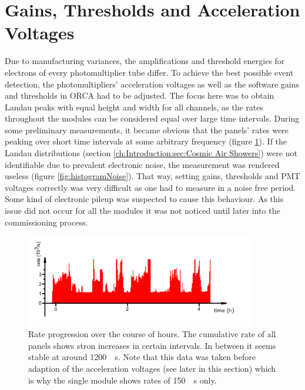   \section{Gains, Thresholds and Acceleration Voltages}
  \label{ch:The muon detection system:sec:Gains, Thresholds and Acceleration Voltages}
	Due to manufacturing variances, the amplifications and threshold energies for electrons of every photomultiplier tube differ.
	To achieve the best possible event detection, the photomultipliers' acceleration voltages as well as the software gains and thresholds in ORCA had to be adjusted.
	The focus here was to obtain Landau peaks with equal height and width for all channels, as the rates throughout the modules can be considered equal over large time intervals.
	During some preliminary measurements, it became obvious that the panels' rates were peaking over short time intervals at some arbitrary frequency (figure \ref{fig:noiseRate}). If the Landau distributions (section \ref{ch:Introduction:sec:Cosmic Air Showers}) were not identifiable due to prevalent electronic noise, the measurement was rendered useless (figure \ref{fig:histogramNoise}). That way, setting gains, thresholds and PMT voltages correctly was very difficult as one had to measure in a noise free period. Some kind of electronic pileup was suspected to cause this behaviour. As this issue did not occur for all the modules it was not noticed until later into the commissioning process.
  \begin{figure}
   \centering
   \includegraphics[width=0.9\textwidth]{graphics/setup/Noise_Rate_Problem_cutout_m.png}
   \caption[Muon modules' rate: noise problems]{Rate progression over the course of hours. The cumulative rate of all panels shows stron increases in certain intervals. In between it seems stable at around \SI{1200}{\per\second}. Note that this data was taken before adaption of the acceleration voltages (see later in this section) which is why the single module shows rates of \SI{150}{\per\second} only. }
	\label{fig:noiseRate}
  \end{figure}
  
